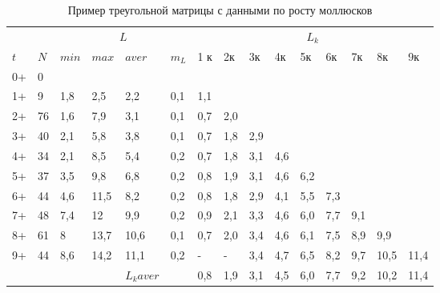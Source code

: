 \begin{table}[p]
        \caption{Пример треугольной матрицы с данными по росту моллюсков}
        \label{tab:rost_matrica_primer}
        \begin{tabularx}{\textwidth}{|X|X|XX|XX|XXXXXXXXX|}
        \hline
        &    & \multicolumn{4}{c|}{$L$}               & \multicolumn{9}{c|}{$L_{k}$} \\ 
        $t$     & $N$  & $min$ & $max$ & $aver$ & $m_{L}$   & 1 к & 2к  & 3к  & 4к  & 5к  & 6к  & 7к  & 8к   & 9к   \\ \hline
        0+      & 0  &       &       &         &         &     &     &     &     &     &     &     &      &      \\
        1+      & 9  & 1,8   & 2,5   & 2,2     & 0,1     & 1,1 &     &     &     &     &     &     &      &      \\
        2+      & 76 & 1,6   & 7,9   & 3,1     & 0,1     &\cellcolor{yellow}0,7 & \cellcolor{yellow}2,0 &     &     &     &     &     &      &      \\
        3+      & 40 & 2,1   & 5,8   & 3,8     & 0,1     & 0,7 & 1,8 & 2,9 &     &     &     &     &      &      \\
        4+      & 34 & 2,1   & 8,5   & 5,4     & 0,2     & 0,7 & 1,8 & 3,1 & 4,6 &     &     &     &      &      \\
        5+      & 37 & 3,5   & 9,8   & 6,8     & 0,2     & 0,8 & 1,9 & 3,1 & 4,6 & 6,2 &     &     &      &      \\
        6+      & 44 & 4,6   & 11,5  & 8,2     & 0,2     & 0,8 & 1,8 & 2,9 & 4,1 & 5,5 & 7,3 &     &      &      \\
        7+      & 48 & 7,4   & 12    & 9,9     & 0,2     & 0,9 & 2,1 & 3,3 & 4,6 & 6,0 & 7,7 & 9,1 &      &      \\
        8+      & 61 & 8     & 13,7  & 10,6    & 0,1     & \cellcolor{red}0,7 & \cellcolor{red}2,0 & \cellcolor{red}3,4 & \cellcolor{red}4,6 & \cellcolor{red}6,1 & \cellcolor{red}7,5 & \cellcolor{red}8,9 & \cellcolor{red}9,9  &      \\
        9+      & 44 & 8,6   & 14,2  & 11,1    & 0,2     & -   & -   & 3,4 & 4,7 & 6,5 & 8,2 & 9,7 & 10,5 & 11,4 \\ \hline
                &    &       &       & $L_{k} aver$  &  & \cellcolor{blue}0,8 & \cellcolor{blue}1,9 & \cellcolor{blue}3,1 & \cellcolor{blue}4,5 & \cellcolor{blue}6,0 & \cellcolor{blue}7,7 & \cellcolor{blue}9,2 & \cellcolor{blue}10,2 & \cellcolor{blue}11,4 \\

\end{tabularx}
\end{table}
